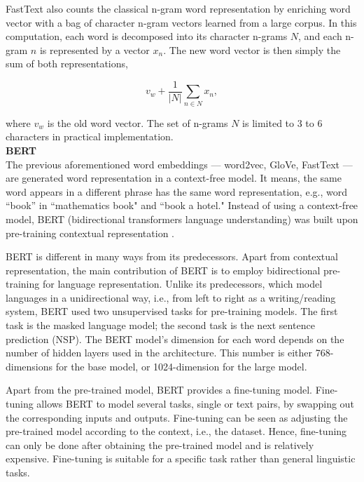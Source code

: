 FastText also counts the classical n-gram word representation by enriching word
vector with a bag of character n-gram vectors learned from a large corpus. In
this computation, each word is decomposed into its character n-grams $N$, and
each n-gram $n$ is represented by a vector $x_n$. The new word vector is then
simply the sum of both representations,

\begin{equation}
v_w + \dfrac{1}{|N|} \sum_{n\in N}x_n,
\label{eq:subword}
\end{equation}

\noindent where $v_w$ is the old word vector. The set of n-grams $N$ is limited
to 3 to 6 characters in practical implementation. \\


\noindent \textbf{BERT} \\
The previous aforementioned word embeddings --- word2vec, GloVe, FastText ---
are generated word representation in a context-free model. It means, the same
word appears in a different phrase has the same word representation, e.g., word
``book'' in ``mathematics book" and ``book a hotel." Instead of using a
context-free model, BERT (bidirectional transformers language understanding)
was built upon pre-training contextual representation \cite{Devlin2018}.

BERT is different in many ways from its predecessors. Apart from contextual
representation, the main contribution of BERT is to employ bidirectional
pre-training for language representation. Unlike its predecessors, which model
languages in a unidirectional way, i.e., from left to right as a
writing/reading system, BERT used two unsupervised tasks for pre-training
models. The first task is the masked language model; the second task is the
next sentence prediction (NSP). The BERT model's dimension for each word
depends on the number of hidden layers used in the architecture. This number is
either 768-dimensions for the base model, or 1024-dimension for the large
model.

Apart from the pre-trained model, BERT provides a fine-tuning model.
Fine-tuning allows BERT to model several tasks, single or text pairs, by
swapping out the corresponding inputs and outputs. Fine-tuning can be seen as
adjusting the pre-trained model according to the context, i.e., the dataset.
Hence, fine-tuning can only be done after obtaining the pre-trained model and
is relatively expensive. Fine-tuning is suitable for a specific task rather
than general linguistic tasks.

